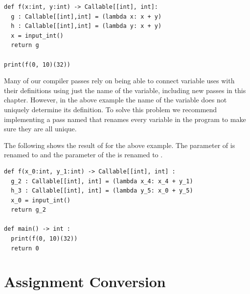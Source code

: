 \documentclass[7x10]{TimesAPriori_MIT}%
\def\racketEd{0}
\def\pythonEd{1}
\def\edition{0}
\newcommand{\racket}[1]{{\if\edition\racketEd{#1}\fi}}
\newcommand{\python}[1]{{\if\edition\pythonEd #1\fi}}
\numberwithin{theorem}{chapter}
\numberwithin{definition}{chapter}
\numberwithin{equation}{chapter}
\begin{document}
\begin{lstlisting}
def f(x:int, y:int) -> Callable[[int], int]:
  g : Callable[[int],int] = (lambda x: x + y)
  h : Callable[[int],int] = (lambda y: x + y)
  x = input_int()
  return g

print(f(0, 10)(32))
\end{lstlisting}

Many of our compiler passes rely on being able to connect variable
uses with their definitions using just the name of the variable,
including new passes in this chapter. However, in the above example
the name of the variable does not uniquely determine its
definition. To solve this problem we recommend implementing a pass
named  that renames every variable in the program to
make sure they are all unique.

The following shows the result of  for the above
example. The  parameter of  is renamed to 
and the  parameter of the  is renamed to
.

\begin{lstlisting}
def f(x_0:int, y_1:int) -> Callable[[int], int] :
  g_2 : Callable[[int], int] = (lambda x_4: x_4 + y_1)
  h_3 : Callable[[int], int] = (lambda y_5: x_0 + y_5)
  x_0 = input_int()
  return g_2

def main() -> int :
  print(f(0, 10)(32))
  return 0
\end{lstlisting}

\fi



\section{Assignment Conversion}
\label{sec:convert-assignments}
\end{document}
